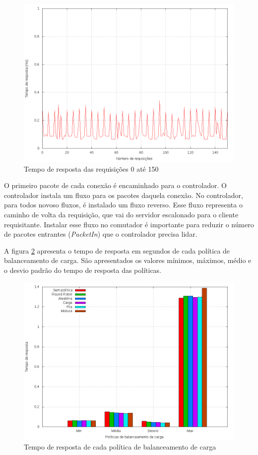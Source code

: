\begin{figure}[htb!]
    \centering
    \includegraphics[scale=0.4]{img/balancer-http-zoom}
    \caption{Tempo de resposta das requisições 0 até 150}
    \label{fig:balancer-http-zoom}
\end{figure}

O primeiro pacote de cada conexão é encaminhado para o controlador.
O controlador instala um fluxo para os pacotes daquela conexão.
No controlador, para todos novoso fluxos, é instalado um fluxo reverso.
Esse fluxo representa o caminho de volta da requisição, que vai do servidor
escalonado para o cliente requisitante.
Instalar esse fluxo no comutador é importante para reduzir o número de 
pacotes entrantes (\emph{PacketIn}) que o controlador precisa lidar.

A figura \ref{fig:balancer-http-times} apresenta o tempo de resposta em segundos
de cada política de balanceamento de carga.
São apresentados os valores mínimos, máximos, médio e o desvio padrão do 
tempo de resposta das políticas.

\begin{figure}[htb!]
    \centering
    \includegraphics[width=\linewidth]{img/balancer-http-times}
    \caption{Tempo de resposta de cada política de balanceamento de carga}
    \label{fig:balancer-http-times}
\end{figure}

